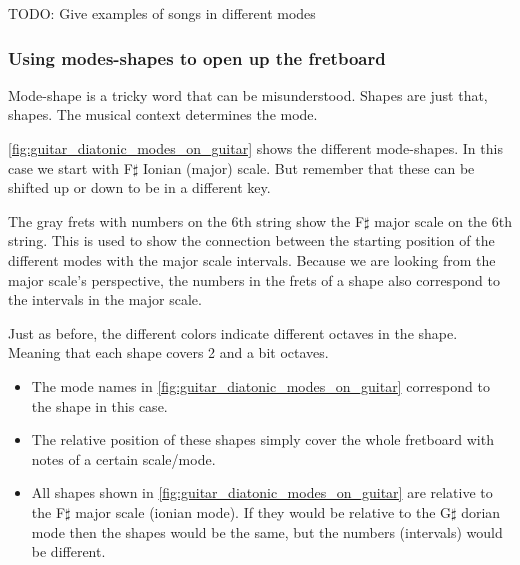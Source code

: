 \newpage

TODO: Give examples of songs in different modes

\newpage

\subsubsection{Using modes-shapes to open up the fretboard}

Mode-shape is a tricky word that can be misunderstood. Shapes are just that, shapes. The musical context determines the mode.

\autoref{fig:guitar_diatonic_modes_on_guitar} shows the different mode-shapes. In this case we start with F$\sharp$ Ionian (major) scale. But remember that these can be shifted up or down to be in a different key.

The gray frets with numbers on the 6th string show the F$\sharp$ major scale on the 6th string. This is used to show the connection between the starting position of the different modes with the major scale intervals. Because we are looking from the major scale's perspective, the numbers in the frets of a shape also correspond to the intervals in the major scale.

Just as before, the different colors indicate different octaves in the shape. Meaning that each shape covers 2 and a bit octaves.

\infobox
{
	\begin{itemize}
		\item The mode names in \autoref{fig:guitar_diatonic_modes_on_guitar} correspond to the shape in this case.
		\item The relative position of these shapes simply cover the whole fretboard with notes of a certain scale/mode.
		\item All shapes shown in \autoref{fig:guitar_diatonic_modes_on_guitar} are relative to the F$\sharp$ major scale (ionian mode). If they would be relative to the G$\sharp$ dorian mode then the shapes would be the same, but the numbers (intervals) would be different.
	\end{itemize}
}

\newpage

